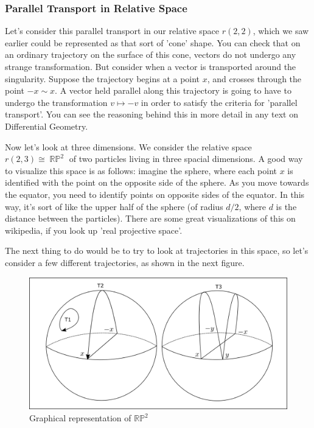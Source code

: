 \documentclass{article}
\DeclareMathOperator{\RP}{\mathbb{RP}}
\begin{document}
\subsubsection{Parallel Transport in Relative Space}
Let's consider this parallel transport in our relative space $r(2,2)$, which we saw earlier could be represented as that sort of 'cone' shape. You can check that on an ordinary trajectory on the surface of this cone, vectors do not undergo any strange transformation. But consider when a vector is transported around the singularity. Suppose the trajectory begins at a point $x$, and crosses through the point $-x \sim x$. A vector held parallel along this trajectory is going to have to undergo the transformation $v \mapsto -v$ in order to satisfy the criteria for 'parallel transport'. You can see the reasoning behind this in more detail in any text on Differential Geometry.

Now let's look at three dimensions. We consider the relative space $r(2,3) \cong \RP^2$ of two particles living in three spacial dimensions. A good way to visualize this space is as follows: imagine the sphere, where each point $x$ is identified with the point on the opposite side of the sphere. As you move towards the equator, you need to identify points on opposite sides of the equator. In this way, it's sort of like the upper half of the sphere (of radius $d/2$, where $d$ is the distance between the particles). There are some great visualizations of this on wikipedia, if you look up 'real projective space'.

The next thing to do would be to try to look at trajectories in this space, so let's consider a few different trajectories, as shown in the next figure.

\begin{figure}[h]
    \centering
    \includegraphics[width=\linewidth]{Figures/trajectories_in_rp2.png}
    \captionsetup{belowskip=-15pt}
    \caption{Graphical representation of $ \mathbb{RP}^2 $}
    \label{fig:23}
\end{figure}
\end{document}
